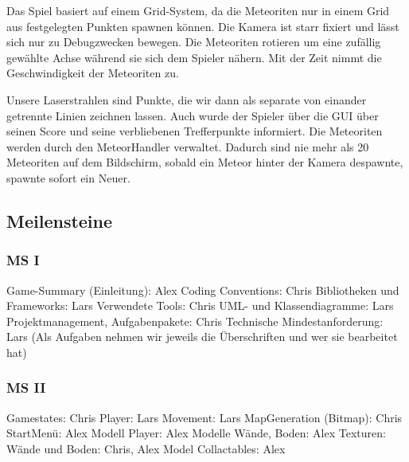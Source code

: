 \documentclass[10pt]{article}
\begin{document}
\noindent Das Spiel basiert auf einem Grid-System, da die Meteoriten nur in einem Grid aus festgelegten Punkten spawnen können. Die
Kamera ist starr fixiert und lässt sich nur zu Debugzwecken bewegen. Die Meteoriten rotieren um eine zufällig gewählte Achse während
sie sich dem Spieler nähern. Mit der Zeit nimmt die Geschwindigkeit der Meteoriten zu.\newline

\noindent Unsere Laserstrahlen sind Punkte, die wir dann als separate von einander getrennte Linien zeichnen lassen.
Auch wurde der Spieler über die GUI über seinen Score und seine verbliebenen Trefferpunkte informiert.
Die Meteoriten werden durch den MeteorHandler verwaltet. Dadurch sind nie mehr als 20 Meteoriten auf dem Bildschirm, sobald ein Meteor
hinter der Kamera despawnte, spawnte sofort ein Neuer.

\newpage
\vspace{0.5cm}
\subsection{Meilensteine}

\vspace{0.5cm}
\subsubsection{MS I}

Game-Summary (Einleitung): Alex\newline
Coding Conventions: Chris\newline
Bibliotheken und Frameworks: Lars\newline
Verwendete Tools: Chris\newline
UML- und Klassendiagramme: Lars\newline
Projektmanagement, Aufgabenpakete: Chris\newline
Technische Mindestanforderung: Lars\newline
(Als Aufgaben nehmen wir jeweils die Überschriften und wer sie bearbeitet hat)\newline
\newline

\vspace{0.5cm}
\subsubsection{MS II}

Gamestates: Chris\newline
Player: Lars\newline
Movement: Lars
MapGeneration (Bitmap): Chris\newline
StartMenü: Alex\newline
Modell Player: Alex\newline
Modelle Wände, Boden: Alex\newline
Texturen: Wände und Boden: Chris, Alex\newline
Model Collactables: Alex\newline
\newline
\end{document}
